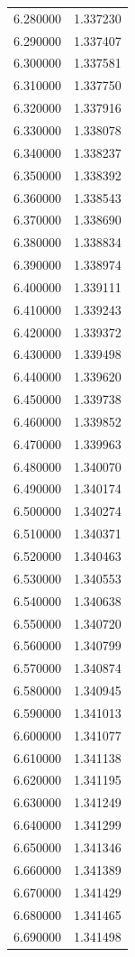 \begin{tabular}{rr}
6.280000 & 1.337230 \\
6.290000 & 1.337407 \\
6.300000 & 1.337581 \\
6.310000 & 1.337750 \\
6.320000 & 1.337916 \\
6.330000 & 1.338078 \\
6.340000 & 1.338237 \\
6.350000 & 1.338392 \\
6.360000 & 1.338543 \\
6.370000 & 1.338690 \\
6.380000 & 1.338834 \\
6.390000 & 1.338974 \\
6.400000 & 1.339111 \\
6.410000 & 1.339243 \\
6.420000 & 1.339372 \\
6.430000 & 1.339498 \\
6.440000 & 1.339620 \\
6.450000 & 1.339738 \\
6.460000 & 1.339852 \\
6.470000 & 1.339963 \\
6.480000 & 1.340070 \\
6.490000 & 1.340174 \\
6.500000 & 1.340274 \\
6.510000 & 1.340371 \\
6.520000 & 1.340463 \\
6.530000 & 1.340553 \\
6.540000 & 1.340638 \\
6.550000 & 1.340720 \\
6.560000 & 1.340799 \\
6.570000 & 1.340874 \\
6.580000 & 1.340945 \\
6.590000 & 1.341013 \\
6.600000 & 1.341077 \\
6.610000 & 1.341138 \\
6.620000 & 1.341195 \\
6.630000 & 1.341249 \\
6.640000 & 1.341299 \\
6.650000 & 1.341346 \\
6.660000 & 1.341389 \\
6.670000 & 1.341429 \\
6.680000 & 1.341465 \\
6.690000 & 1.341498 \\

\end{tabular}
